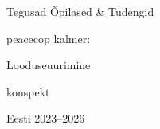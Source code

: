 \begin{titlepage}
\par{Tegusad Õpilased \& Tudengid}
\vspace{0.3\textheight}
\par{peacecop kalmer:}
\LARGE
\par{Looduseuurimine}
\normalsize
\par{konspekt}
\vspace{0.3\textheight}
\begin{flushright}
\par{}
\end{flushright}
\vfill
Eesti
\hfill
\numrange[range-phrase = --]{2023}{2026}
\end{titlepage}
